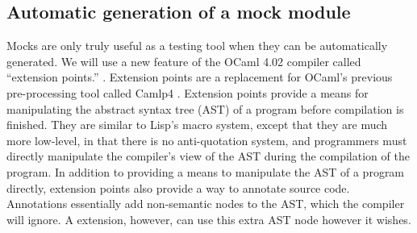 

\subsection{Automatic generation of a mock module}
\label{application:generation}

Mocks are only truly useful as a testing tool when they can be
automatically generated. We will use a new feature of the OCaml 4.02
compiler called ``extension points.'' \cite{www:ppx}. Extension points
are a replacement for OCaml's previous pre-processing tool called
Camlp4 \cite{www:camlp4}. Extension points provide a means for
manipulating the abstract syntax tree (AST) of a program before
compilation is finished. They are similar to Lisp's macro system,
except that they are much more low-level, in that there is no
anti-quotation system, and programmers must directly manipulate the
compiler's view of the AST during the compilation of the program. In
addition to providing a means to manipulate the AST of a program
directly, extension points also provide a way to annotate source
code. Annotations essentially add non-semantic nodes to the AST, which
the compiler will ignore. A extension, however, can use this extra AST
node however it wishes.

